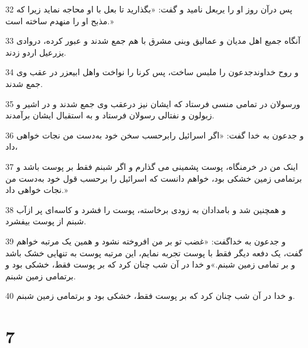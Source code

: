 \par 32 پس درآن روز او را یربعل نامید و گفت: «بگذارید تا بعل با او محاجه نماید زیرا که مذبح او را منهدم ساخته است.»
\par 33 آنگاه جمیع اهل مدیان و عمالیق وبنی مشرق با هم جمع شدند و عبور کرده، دروادی یزرعیل اردو زدند.
\par 34 و روح خداوندجدعون را ملبس ساخت، پس کرنا را نواخت واهل ابیعزر در عقب وی جمع شدند.
\par 35 ورسولان در تمامی منسی فرستاد که ایشان نیز درعقب وی جمع شدند و در اشیر و زبولون و نفتالی رسولان فرستاد و به استقبال ایشان برآمدند.
\par 36 و جدعون به خدا گفت: «اگر اسرائیل رابرحسب سخن خود به‌دست من نجات خواهی داد،
\par 37 اینک من در خرمنگاه، پوست پشمینی می گذارم و اگر شبنم فقط بر پوست باشد و برتمامی زمین خشکی بود، خواهم دانست که اسرائیل را برحسب قول خود به‌دست من نجات خواهی داد.»
\par 38 و همچنین شد و بامدادان به زودی برخاسته، پوست را فشرد و کاسه‌ای پر ازآب شبنم از پوست بیفشرد.
\par 39 و جدعون به خداگفت: «غضب تو بر من افروخته نشود و همین یک مرتبه خواهم گفت، یک دفعه دیگر فقط با پوست تجربه نمایم، این مرتبه پوست به تنهایی خشک باشد و بر تمامی زمین شبنم.»و خدا در آن شب چنان کرد که بر پوست فقط، خشکی بود و برتمامی زمین شبنم.
\par 40 و خدا در آن شب چنان کرد که بر پوست فقط، خشکی بود و برتمامی زمین شبنم.
 
\chapter{7}

